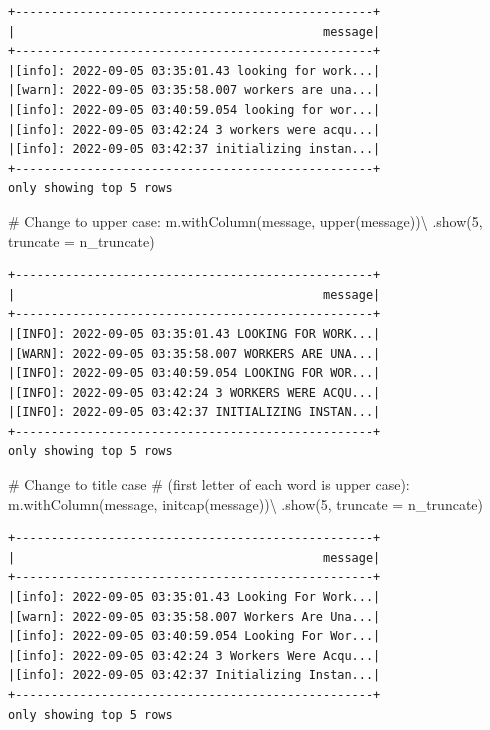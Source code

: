 \documentclass[
  11pt,
  letterpaper,
  DIV=11,
  numbers=noendperiod]{scrreprt}
\newenvironment{Shaded}{\begin{snugshade}}{\end{snugshade}}
\newcommand{\CommentTok}[1]{\textcolor[rgb]{0.37,0.37,0.37}{#1}}
\newcommand{\DecValTok}[1]{\textcolor[rgb]{0.68,0.00,0.00}{#1}}
\newcommand{\NormalTok}[1]{\textcolor[rgb]{0.00,0.23,0.31}{#1}}
\newcommand{\OperatorTok}[1]{\textcolor[rgb]{0.37,0.37,0.37}{#1}}
\newcommand{\StringTok}[1]{\textcolor[rgb]{0.13,0.47,0.30}{#1}}
\begin{document}
\begin{verbatim}
+--------------------------------------------------+
|                                           message|
+--------------------------------------------------+
|[info]: 2022-09-05 03:35:01.43 looking for work...|
|[warn]: 2022-09-05 03:35:58.007 workers are una...|
|[info]: 2022-09-05 03:40:59.054 looking for wor...|
|[info]: 2022-09-05 03:42:24 3 workers were acqu...|
|[info]: 2022-09-05 03:42:37 initializing instan...|
+--------------------------------------------------+
only showing top 5 rows
\end{verbatim}

\begin{Shaded}
\begin{Highlighting}[]
\CommentTok{\# Change to upper case:}
\NormalTok{m.withColumn(}\StringTok{\textquotesingle{}message\textquotesingle{}}\NormalTok{, upper(}\StringTok{\textquotesingle{}message\textquotesingle{}}\NormalTok{))}\OperatorTok{\textbackslash{}}
\NormalTok{    .show(}\DecValTok{5}\NormalTok{, truncate }\OperatorTok{=}\NormalTok{ n\_truncate)}
\end{Highlighting}
\end{Shaded}

\begin{verbatim}
+--------------------------------------------------+
|                                           message|
+--------------------------------------------------+
|[INFO]: 2022-09-05 03:35:01.43 LOOKING FOR WORK...|
|[WARN]: 2022-09-05 03:35:58.007 WORKERS ARE UNA...|
|[INFO]: 2022-09-05 03:40:59.054 LOOKING FOR WOR...|
|[INFO]: 2022-09-05 03:42:24 3 WORKERS WERE ACQU...|
|[INFO]: 2022-09-05 03:42:37 INITIALIZING INSTAN...|
+--------------------------------------------------+
only showing top 5 rows
\end{verbatim}

\begin{Shaded}
\begin{Highlighting}[]
\CommentTok{\# Change to title case}
\CommentTok{\# (first letter of each word is upper case):}
\NormalTok{m.withColumn(}\StringTok{\textquotesingle{}message\textquotesingle{}}\NormalTok{, initcap(}\StringTok{\textquotesingle{}message\textquotesingle{}}\NormalTok{))}\OperatorTok{\textbackslash{}}
\NormalTok{    .show(}\DecValTok{5}\NormalTok{, truncate }\OperatorTok{=}\NormalTok{ n\_truncate)}
\end{Highlighting}
\end{Shaded}

\begin{verbatim}
+--------------------------------------------------+
|                                           message|
+--------------------------------------------------+
|[info]: 2022-09-05 03:35:01.43 Looking For Work...|
|[warn]: 2022-09-05 03:35:58.007 Workers Are Una...|
|[info]: 2022-09-05 03:40:59.054 Looking For Wor...|
|[info]: 2022-09-05 03:42:24 3 Workers Were Acqu...|
|[info]: 2022-09-05 03:42:37 Initializing Instan...|
+--------------------------------------------------+
only showing top 5 rows
\end{verbatim}
\end{document}
